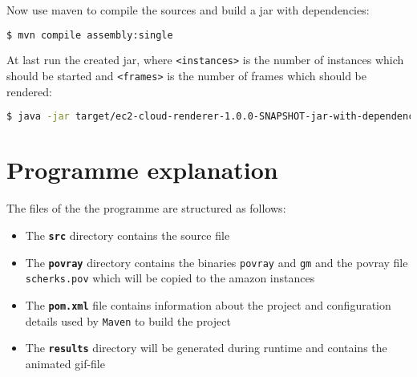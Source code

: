 \documentclass{article}
\begin{document}
Now use maven to compile the sources and build a jar with dependencies:

\begin{lstlisting}[language=bash]
  $ mvn compile assembly:single
\end{lstlisting}

At last run the created jar, where \texttt{<instances>} is the number of instances which should be started and \texttt{<frames>} is the number of frames which should be rendered:

\begin{lstlisting}[language=bash]
  $ java -jar target/ec2-cloud-renderer-1.0.0-SNAPSHOT-jar-with-dependencies.jar <aws_access_key_id> <aws_secret_access_key> <instances> <frames>
\end{lstlisting}




\section{Programme explanation}
The files of the the programme are structured as follows:

\begin{itemize}
\item The \texttt{\textbf{src}} directory contains the source file
\item The \texttt{\textbf{povray}} directory contains the binaries \texttt{povray} and \texttt{gm} and the povray file \texttt{scherks.pov} which will be copied to the amazon instances
\item The \texttt{\textbf{pom.xml}} file contains information about the project and configuration details used by \texttt{Maven} to build the project
\item The \texttt{\textbf{results}} directory will be generated during runtime and contains the animated gif-file
\end{itemize}
\end{document}
